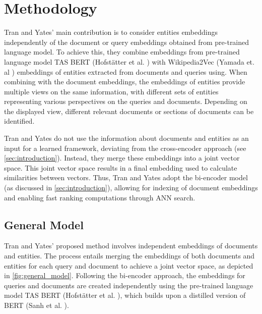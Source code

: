 \section{Methodology}\label{sec:methods}

Tran and Yates' \cite{tran2022dense} main contribution is to consider entities embeddings independently of the document or query embeddings obtained from pre-trained language model. To achieve this, they combine embeddings from pre-trained language model TAS BERT (Hofstätter et al. \cite{tasbert}) with Wikipedia2Vec (Yamada et. al \cite{yamada2018wikipedia2vec}) embeddings of entities extracted from documents and queries using. When combining with the document embeddings, the embeddings of entities provide multiple views on the same information, with different sets of entities representing various perspectives on the queries and documents. Depending on the displayed view, different relevant documents or sections of documents can be identified.

Tran and Yates do not use the information about documents and entities as an input for a learned framework, deviating from the cross-encoder approach (see \autoref{sec:introduction}). Instead, they merge these embeddings into a joint vector space. This joint vector space results in a final embedding used to calculate similarities between vectors. Thus, Tran and Yates adopt the bi-encoder model (as discussed in \autoref{sec:introduction}), allowing for indexing of document embeddings and enabling fast ranking computations through ANN search. 

\subsection{General Model}\label{subsec:general_model}

Tran and Yates' proposed method involves independent embeddings of documents and entities. The process entails merging the embeddings of both documents and entities for each query and document to achieve a joint vector space, as depicted in \autoref{fig:general_model}. Following the bi-encoder approach, the embeddings for queries and documents are created independently using the pre-trained language model TAS BERT (Hofstätter et al. \cite{tasbert}), which builds upon a distilled version of BERT (Sanh et al. \cite{sanh2019distilbert}).

